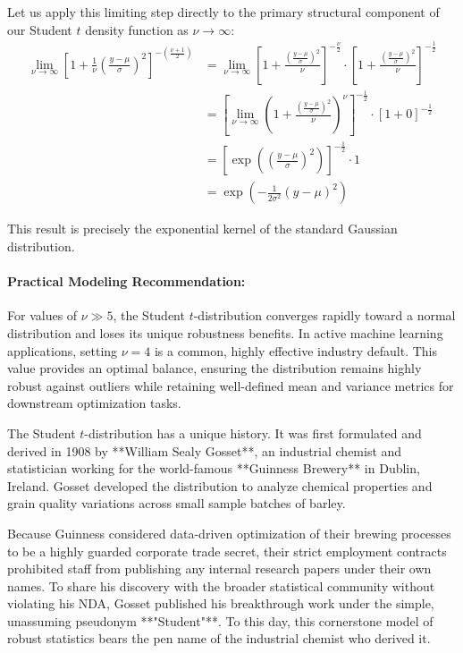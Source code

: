 \documentclass{article}
\begin{document}
Let us apply this limiting step directly to the primary structural component of our Student $t$ density function as $\nu \to \infty$:
\begin{align}
    \lim_{\nu \to \infty} \left[ 1 + \frac{1}{\nu}\left(\frac{y-\mu}{\sigma}\right)^2 \right]^{-\left(\frac{\nu+1}{2}\right)} &= \lim_{\nu \to \infty} \left[ 1 + \frac{\left(\frac{y-\mu}{\sigma}\right)^2}{\nu} \right]^{-\frac{\nu}{2}} \cdot \left[ 1 + \frac{\left(\frac{y-\mu}{\sigma}\right)^2}{\nu} \right]^{-\frac{1}{2}} \\
    &= \left[ \lim_{\nu \to \infty} \left( 1 + \frac{\left(\frac{y-\mu}{\sigma}\right)^2}{\nu} \right)^\nu \right]^{-\frac{1}{2}} \cdot \left[ 1 + 0 \right]^{-\frac{1}{2}} \\
    &= \left[ \exp\left( \left(\frac{y-\mu}{\sigma}\right)^2 \right) \right]^{-\frac{1}{2}} \cdot 1 \\
    &= \exp\left( -\frac{1}{2\sigma^2}(y - \mu)^2 \right)
\end{align}

This result is precisely the exponential kernel of the standard Gaussian distribution. 

\paragraph{Practical Modeling Recommendation:}
For values of $\nu \gg 5$, the Student $t$-distribution converges rapidly toward a normal distribution and loses its unique robustness benefits. In active machine learning applications, setting $\nu = 4$ is a common, highly effective industry default. This value provides an optimal balance, ensuring the distribution remains highly robust against outliers while retaining well-defined mean and variance metrics for downstream optimization tasks.

\begin{tcolorbox}[colback=red!5!white, colframe=red!60!black, title=Historical Vignette: The Guinness Secret Pseudonym]
The Student $t$-distribution has a unique history. It was first formulated and derived in 1908 by **William Sealy Gosset**, an industrial chemist and statistician working for the world-famous **Guinness Brewery** in Dublin, Ireland. Gosset developed the distribution to analyze chemical properties and grain quality variations across small sample batches of barley.

Because Guinness considered data-driven optimization of their brewing processes to be a highly guarded corporate trade secret, their strict employment contracts prohibited staff from publishing any internal research papers under their own names. To share his discovery with the broader statistical community without violating his NDA, Gosset published his breakthrough work under the simple, unassuming pseudonym **"Student"**. To this day, this cornerstone model of robust statistics bears the pen name of the industrial chemist who derived it.
\end{tcolorbox}
\end{document}
